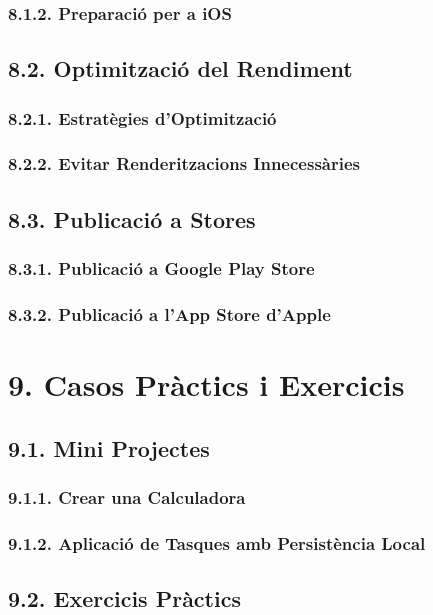 \documentclass[12pt]{beamer}
\begin{document}
	\subsubsection{8.1.2. Preparació per a iOS}
	
	\subsection{8.2. Optimització del Rendiment}
	\subsubsection{8.2.1. Estratègies d’Optimització}
	\subsubsection{8.2.2. Evitar Renderitzacions Innecessàries}
	
	\subsection{8.3. Publicació a Stores}
	\subsubsection{8.3.1. Publicació a Google Play Store}
	\subsubsection{8.3.2. Publicació a l'App Store d'Apple}
	
	\section{9. Casos Pràctics i Exercicis}
	
	\subsection{9.1. Mini Projectes}
	\subsubsection{9.1.1. Crear una Calculadora}
	\subsubsection{9.1.2. Aplicació de Tasques amb Persistència Local}
	
	\subsection{9.2. Exercicis Pràctics}
\end{document}
